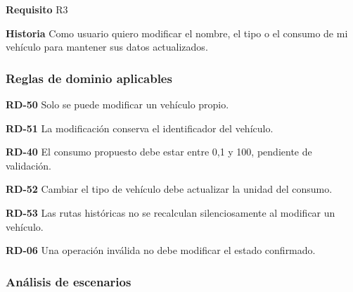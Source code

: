 \textbf{Requisito} R3\par

\textbf{Historia} Como usuario quiero modificar el nombre, el tipo o el consumo de mi vehículo para mantener sus datos actualizados.\par

\subsubsection*{Reglas de dominio aplicables}

\textbf{RD-50} Solo se puede modificar un vehículo propio.\par

\textbf{RD-51} La modificación conserva el identificador del vehículo.\par

\textbf{RD-40} El consumo propuesto debe estar entre 0,1 y 100, pendiente de validación.\par

\textbf{RD-52} Cambiar el tipo de vehículo debe actualizar la unidad del consumo.\par

\textbf{RD-53} Las rutas históricas no se recalculan silenciosamente al modificar un vehículo.\par

\textbf{RD-06} Una operación inválida no debe modificar el estado confirmado.\par

\subsubsection*{Análisis de escenarios}

